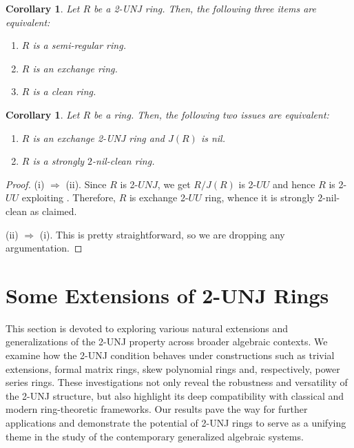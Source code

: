 \documentclass[12pt]{amsart}
\newtheorem{corollary}[theorem]{Corollary}
\theoremstyle{definition}
\begin{document}
\begin{corollary}\label{3.17}
Let \( R \) be a 2-UNJ ring. Then, the following three items are equivalent:
\begin{enumerate}
\item
\( R \) is a semi-regular ring.
\item
\( R \) is an exchange ring.
\item
\( R \) is a clean ring.
\end{enumerate}
\end{corollary}

\begin{corollary}\label{3.18}
Let \( R \) be a ring. Then, the following two issues are equivalent:
\begin{enumerate}
\item
\( R \) is an exchange 2-UNJ ring and \(J(R)\) is nil.
\item
\( R \) is a strongly $2$-nil-clean ring.
\end{enumerate}
\end{corollary}

\begin{proof}
(i) \(\Rightarrow\) (ii). Since \( R \) is 2-$UNJ$, we get $R/J(R)$ is 2-$UU$ and hence $R$ is 2-$UU$ exploiting \cite[Lemma 2.1]{10}. Therefore, \( R \) is exchange 2-$UU$ ring, whence it is strongly \( 2 \)-nil-clean as \cite[Theorem 4.1]{10} claimed.

(ii) \(\Rightarrow\) (i). This is pretty straightforward, so we are dropping any argumentation.
\end{proof}

\section{Some Extensions of 2-UNJ Rings}

This section is devoted to exploring various natural extensions and generalizations of the 2-UNJ property across broader algebraic contexts. We examine how the 2-UNJ condition behaves under constructions such as trivial extensions, formal matrix rings, skew polynomial rings and, respectively, power series rings. These investigations not only reveal the robustness and versatility of the 2-UNJ structure, but also highlight its deep compatibility with classical and modern ring-theoretic frameworks. Our results pave the way for further applications and demonstrate the potential of 2-UNJ rings to serve as a unifying theme in the study of the contemporary generalized algebraic systems.
\end{document}
